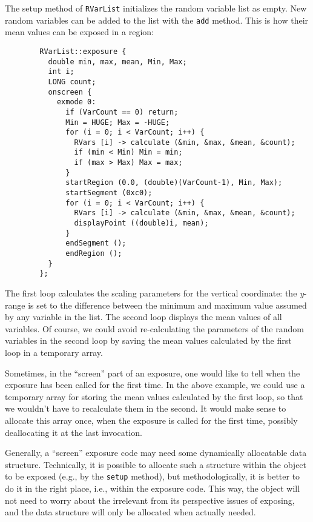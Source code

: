The setup method of {\tt RVarList} initializes the random variable list as
empty.
New random variables can be added to the list with the {\tt add}
method.
This is how their mean values can be exposed in a region:

\begin{verbatim}
        RVarList::exposure {
          double min, max, mean, Min, Max;
          int i;
          LONG count;
          onscreen {
            exmode 0:
              if (VarCount == 0) return;
              Min = HUGE; Max = -HUGE;
              for (i = 0; i < VarCount; i++) {
                RVars [i] -> calculate (&min, &max, &mean, &count);
                if (min < Min) Min = min;
                if (max > Max) Max = max;
              }
              startRegion (0.0, (double)(VarCount-1), Min, Max);
              startSegment (0xc0);
              for (i = 0; i < VarCount; i++) {
                RVars [i] -> calculate (&min, &max, &mean, &count);
                displayPoint ((double)i, mean);
              }
              endSegment ();
              endRegion ();
          }
        };
\end{verbatim}

The first loop calculates the scaling parameters for the vertical
coordinate: the {\em y\/}-range is set to the difference between the minimum and
maximum value assumed by any variable in the list.
The second loop displays the mean values of all variables.
Of course, we could avoid re-calculating the parameters of the random variables
in the second loop
by saving the mean values calculated by the first loop in a temporary
array.

\medskip

\noindent
Sometimes, in the ``screen'' part of an exposure,
one would like to tell when the
exposure has been called for the first time.
In the above example, we could use a temporary array for storing the mean
values calculated by the first loop, so that we wouldn't have to
recalculate them in the second.
It would make sense to allocate this array once, when the exposure is called
for the first time, possibly deallocating it at the last invocation.

Generally, a ``screen'' exposure code
may need some dynamically allocatable data structure.
Technically, it is possible to allocate such a
structure within the object to be exposed (e.g., by the {\tt setup}
method), but methodologically, it is better to do it in the right place, i.e.,
within the exposure code.
This way, the object will not need to worry about the irrelevant from its
perspective issues of exposing, and the data structure will only be allocated
when actually needed.

